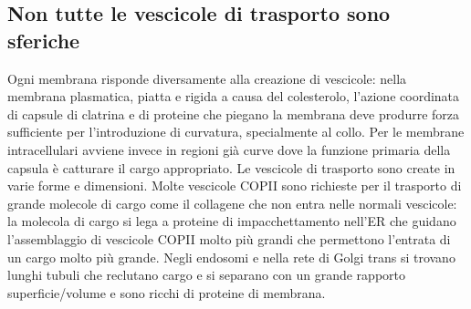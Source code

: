 \subsection{Non tutte le vescicole di trasporto sono sferiche}
Ogni membrana risponde diversamente alla creazione di vescicole: nella membrana plasmatica, piatta e rigida a causa del colesterolo, l'azione coordinata di capsule di clatrina e
di proteine che piegano la membrana deve produrre forza sufficiente per l'introduzione di curvatura, specialmente al collo. Per le membrane intracellulari avviene invece in regioni
gi\`a curve dove la funzione primaria della capsula \`e catturare il cargo appropriato. Le vescicole di trasporto sono create in varie forme e dimensioni. Molte vescicole COPII sono
richieste per il trasporto di grande molecole di cargo come il collagene che non entra nelle normali vescicole: la molecola di cargo si lega a proteine di impacchettamento nell'ER che
guidano l'assemblaggio di vescicole COPII molto pi\`u grandi che permettono l'entrata di un cargo molto pi\`u grande. Negli endosomi e nella rete di Golgi trans si trovano lunghi tubuli
che reclutano cargo e si separano con un grande rapporto superficie/volume e sono ricchi di proteine di membrana. 
